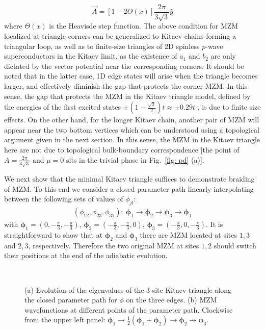 \begin{equation}\label{eq:Astep}
  \vec{A} =\left[1-2\Theta(x)\right]\frac{2 \pi}{3\sqrt{3}} \hat{y}
\end{equation}
where $\Theta(x)$ is the Heavisde step function. The above condition for MZM localized at triangle corners can be generalized to Kitaev chains forming a triangular loop, as well as to finite-size triangles of 2D spinless $p$-wave superconductors in the Kitaev limit, as the existence of $a_1$ and $b_2$ are only dictated by the vector potential near the corresponding corners. It should be noted that in the latter case, 1D edge states will arise when the triangle becomes larger, and effectively diminish the gap that protects the corner MZM. In this sense, the gap that protects the MZM in the Kitaev triangle model, defined by the energies of the first excited states $\pm (1-\frac{\sqrt{2}}{2})t\approx \pm 0.29 t$ \cite{supp}, is due to finite size effects. On the other hand, for the longer Kitaev chain, another pair of MZM will appear near the two bottom vertices which can be understood using a topological argument given in the next section. In this sense, the MZM in the Kitaev triangle here are not due to topological bulk-boundary correspondence [the point of $A = \frac{2\pi}{3\sqrt{3}}$ and $\mu=0$ sits in the trivial phase in Fig.~\ref{fig: pd} (a)].

We next show that the minimal Kitaev triangle suffices to demonstrate braiding of MZM. To this end we consider a closed parameter path linearly interpolating between the following sets of values of $\phi_{jl}$:
\begin{eqnarray}
  (\phi_{12},\phi_{23},\phi_{31}):~\bm \phi_1\rightarrow \bm \phi_2 \rightarrow \bm \phi_3 \rightarrow \bm \phi_1
\end{eqnarray}
with $\bm \phi_1 = \left(0,-\frac{\pi}{3},-\frac{\pi}{3}\right )$, $\bm \phi_2 = \left(-\frac{\pi}{3},-\frac{\pi}{3}, 0\right)$, $\bm \phi_3 = \left(-\frac{\pi}{3}, 0, -\frac{\pi}{3}\right )$. It is straightforward to show that at $\bm \phi_{2}$ and $\bm \phi_3$ there are MZM located at sites $1,3$ and $2,3$, respectively. Therefore the two original MZM at sites $1,2$ should switch their positions at the end of the adiabatic evolution.

\begin{figure}[ht]
	\centering
  \hspace{-18pt}
  \\
	\caption{(a) Evolution of the eigenvalues of the 3-site Kitaev triangle along the closed parameter path for $\phi$ on the three edges. (b) MZM wavefunctions at different points of the parameter path. Clockwise from the upper left panel: $\bm \phi_1 \rightarrow \frac{1}{2}(\bm \phi_1 + \bm \phi_2)\rightarrow \bm \phi_2\rightarrow \bm \phi_3$.}
	\label{fig:3eig}
\end{figure}

